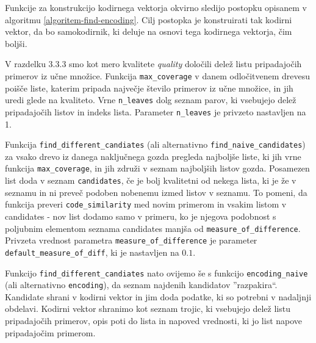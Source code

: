 \documentclass[12pt,a4paper]{article}
\begin{document}



Funkcije za konstrukcijo kodirnega vektorja okvirno sledijo postopku opisanem v algoritmu \ref{algoritem-find-encoding}.
Cilj postopka je konstruirati tak kodirni vektor, da bo samokodirnik, ki deluje na osnovi tega kodirnega vektorja, čim boljši. %

V razdelku 3.3.3 smo kot mero kvalitete \textit{quality} določili delež listu pripadajočih primerov iz učne množice. 
Funkcija \texttt{max\_coverage} v danem odločitvenem drevesu poišče liste, katerim pripada največje število primerov iz učne množice, in jih uredi glede na kvaliteto.
Vrne \texttt{n\_leaves} dolg seznam parov, ki vsebujejo delež pripadajočih listov in indeks lista. 
Parameter \texttt{n\_leaves} je privzeto nastavljen na 1.

Funkcija \texttt{find\_different\_candiates} (ali alternativno \texttt{find\_naive\_candidates}) za vsako drevo iz danega naključnega gozda pregleda najboljše liste, ki jih vrne funkcija \texttt{max\_coverage}, in jih združi v seznam najboljših listov gozda.
Posamezen list doda v seznam \texttt{candidates}, če je bolj kvalitetni od nekega lista, ki je že v seznamu in ni preveč podoben nobenemu izmed listov v seznamu.
To pomeni, da funkcija preveri \texttt{code\_similarity} med novim primerom in vsakim listom v candidates - nov list dodamo samo v primeru, ko je njegova podobnost s poljubnim elementom seznama candidates manjša od \texttt{measure\_of\_difference}.
Privzeta vrednost parametra \texttt{measure\_of\_difference} je parameter \texttt{default\_measure\_of\_diff}, ki je nastavljen na $0.1$.

Funkcijo \texttt{find\_different\_candiates} nato ovijemo še s funkcijo \texttt{encoding\_naive} (ali alternativno \texttt{encoding}), da seznam najdenih kandidatov ''razpakira``.
Kandidate shrani v kodirni vektor in jim doda podatke, ki so potrebni v nadaljnji obdelavi. %
Kodirni vektor shranimo kot seznam trojic, ki vsebujejo delež listu pripadajočih primerov, opis poti do lista in napoved vrednosti, ki jo list napove pripadajočim primerom.
\end{document}
